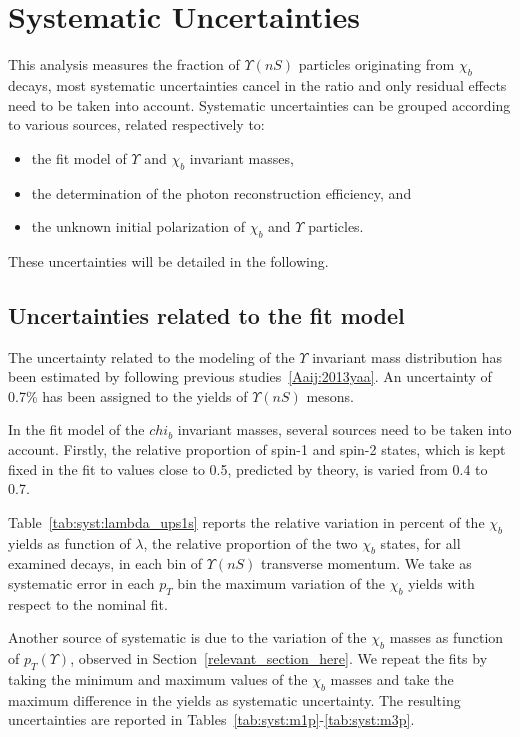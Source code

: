 \section{Systematic Uncertainties}
\label{sec:syst}

This analysis measures the fraction of $\Upsilon(nS)$ particles originating
from $\chi_b$ decays, most systematic uncertainties cancel in the ratio and
only residual effects need to be taken into account. Systematic uncertainties
can be grouped according to various sources, related respectively to:
\begin{itemize}
\item the fit model of $\Upsilon$ and $\chi_b$ invariant masses, 
\item the determination of the photon reconstruction efficiency, and 
\item the unknown initial polarization of $\chi_b$ and $\Upsilon$ particles. 
\end{itemize}
These uncertainties will be detailed in the following. 

\subsection{Uncertainties related to the fit model}

The uncertainty related to the modeling of the $\Upsilon$ invariant mass
distribution has been estimated by following previous
studies~\ref{Aaij:2013yaa}. An uncertainty of 0.7\% has been assigned to the
yields of $\Upsilon(nS)$ mesons.

In the fit model of the $chi_b$ invariant masses, several sources need to be
taken into account. Firstly, the relative proportion of spin-1 and spin-2
states, which is kept fixed in the fit to values close to 0.5, predicted by
theory, is varied from 0.4 to 0.7. 

Table~\ref{tab:syst:lambda_ups1s} reports the relative
variation in percent of the $\chi_b$ yields as function of $\lambda$, the
relative proportion of the two $\chi_b$ states, for all examined decays, in
each bin of $\Upsilon(nS)$ transverse momentum. We take as systematic error in
each $p_T$ bin the maximum variation of the $\chi_b$ yields with respect to the
nominal fit.

Another source of systematic is due to the variation of the $\chi_b$ masses as
function of $p_T(\Upsilon)$, observed in Section~\ref{relevant_section_here}.
We repeat the fits by taking the minimum and maximum values of the $\chi_b$
masses and take the maximum difference in the yields as systematic uncertainty.
The resulting uncertainties are reported in
Tables~\ref{tab:syst:m1p}-\ref{tab:syst:m3p}.


